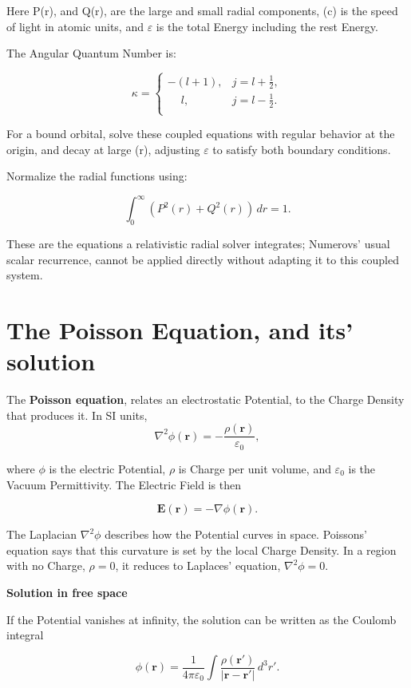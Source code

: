 \documentclass[a4paper, 10pt, onepage]{elegantbook}
\begin{document}
{Here P(r), and Q(r), are the large and small radial components, (c) is the speed of light in atomic units, 
and $\varepsilon$ is the total Energy including the rest Energy.

The Angular Quantum Number is:

\[
\kappa =
\begin{cases}
-(l+1), & j=l+\tfrac12, \\
\phantom{-}l, & j=l-\tfrac12. \\
\end{cases}
\]

For a bound orbital, solve these coupled equations with regular behavior at the origin,
and decay at large (r), adjusting $\varepsilon$ to satisfy both boundary conditions.

Normalize the radial functions using:

\[
\int_0^\infty \left(P^2(r)+Q^2(r)\right)\,dr=1.
\]

These are the equations a relativistic radial solver integrates; Numerovs' usual scalar recurrence,
cannot be applied directly without adapting it to this coupled system.

\section{The Poisson Equation, and its' solution}

The \textbf{Poisson equation}, relates an electrostatic Potential, to the Charge Density that 
produces it. 
In SI units,
\[
\nabla^2\phi(\mathbf r)=-\frac{\rho(\mathbf r)}{\varepsilon_0},
\]

where \(\phi\) is the electric Potential, \(\rho\) is Charge per unit volume, and \(\varepsilon_0\) is the Vacuum 
Permittivity. 
The Electric Field is then

\[
\mathbf E(\mathbf r)=-\nabla\phi(\mathbf r).
\]

The Laplacian \(\nabla^2\phi\) describes how the Potential curves in space.
Poissons' equation says that this curvature is set by the local Charge Density.
In a region with no Charge, \(\rho=0\), it reduces to Laplaces' equation, \(\nabla^2\phi=0\).

\textbf{Solution in free space}

If the Potential vanishes at infinity, the solution can be written as the Coulomb integral

\[
\phi(\mathbf r)
=
\frac{1}{4\pi\varepsilon_0}
\int
\frac{\rho(\mathbf r')}{|\mathbf r-\mathbf r'|}
\,d^3r'.
\]

}
\end{document}
